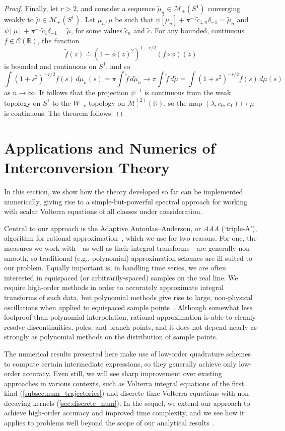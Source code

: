 \documentclass{cams-l} %
\newcommand{\dave}[1]{#1}\newcommand{\davebegin}{}\newcommand{\daveend}{}\newcommand{\george}[1]{#1}
\newcommand{\RR}{\mathbb R}
\newcommand{\cM}{\mathcal M}
\newcommand{\cC}{\mathcal C}
\theoremstyle{definition}
\theoremstyle{remark}
\numberwithin{equation}{section}
\begin{document}
\begin{proof}
    Finally, let $r>2$, and consider a sequence $\widetilde{\mu}_n\in\cM_+(S^1)$ converging weakly to $\widetilde{\mu}\in\cM_+(S^1)$. Let $\mu_n,\mu$ be such that $\psi[\mu_n]+\pi^{-1}\widetilde{c}_{1,n}\delta_{-1}=\widetilde{\mu}_n$ and $\psi[\mu]+\pi^{-1}\widetilde{c}_1\delta_{-1} = \widetilde{\mu}$, for some values $\widetilde{c}_n$ and $\widetilde{c}$. For any bounded, continuous $f\in\cC(\RR)$, the function
    \[\widetilde{f}(z)\doteq (1+\phi(z)^2)^{1-r/2}(f\circ\phi)(z)\]
    is bounded and continuous on $S^1$, and so
    \[\int  (1+s^2)^{-r/2} f(s)\,d\mu_n(s) = \pi\int \widetilde{f}\,d\widetilde{\mu}_n\to \pi\int\widetilde{f}\,d\widetilde{\mu} = \int  (1+s^2)^{-r/2} f(s)\,d\mu(s)\]
    as $n\to\infty$. It follows that the projection $\psi^{-1}$ is continuous from the weak topology on $S^1$ to the $W_{-r}$ topology on $\cM_+^{(2)}(\RR)$, so the map $(\lambda,c_0,c_1)\mapsto \mu$ is continuous. The theorem follows.
\end{proof}
\section{Applications and Numerics of Interconversion Theory}\label{sec:numerics}
In this section, we show how the theory developed so far can be implemented numerically, giving rise to a simple-but-powerful spectral approach for working with scalar Volterra equations of \dave{all classes under consideration}.

Central to our approach is the \george{Adaptive Antoulas--Anderson, or \emph{AAA} (`triple-A'),} algorithm for rational approximation~\cite{nakatsukasa2018aaa}, which we use for two reasons. For one, the measures we work with---as well as their integral transforms---are generally non-smooth, so traditional (e.g., polynomial) approximation schemes are ill-suited to our problem. Equally important is, in handling time series, we are often interested in equispaced (or \dave{arbitrarily-spaced}) samples on the real line. We require high-order methods in order to accurately approximate integral transforms of such data, but polynomial methods give rise to large, non-physical oscillations when applied to equispaced sample points~\cite{doi:10.1137/1.9781611975949}. Although somewhat less foolproof than polynomial interpolation, rational approximation is able to cleanly resolve discontinuities, poles, and branch points, and it does not depend nearly as strongly as polynomial methods on the distribution of sample points.

\dave{The numerical results presented here make use of low-order quadrature schemes to compute certain intermediate expressions, so they generally achieve only low-order accuracy. Even still, we will see sharp improvement over existing approaches in various contexts, such as Volterra integral equations of the first kind (\cref{subsec:num_trajectories}) and discrete-time Volterra equations with non-decaying kernels (\cref{sec:discrete_num}). In the sequel, we extend our approach to achieve high-order accuracy and improved time complexity, and we see how it applies to problems well beyond the scope of our analytical results~\cite{sieve}}.
\end{document}
